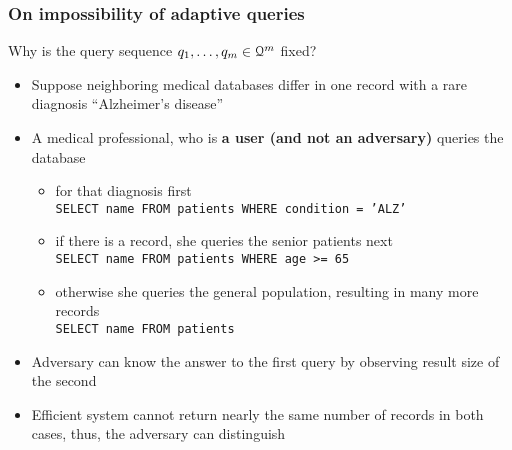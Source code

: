 	\begin{frame}[label={frame:appendix:cdp-odb-adaptive}]

		\frametitle{On impossibility of adaptive queries}

		\begin{block}{Why is the query sequence $\fromNtoM{\query}{1}{m} \in \querySet^m$ fixed?}
			\justify%

			\begin{itemize}
				\item<1-> Suppose neighboring medical databases differ in one record with a rare diagnosis ``Alzheimer's disease''
				\item<2-> A medical professional, who is \textbf{a user (and not an adversary)} queries the database
					\begin{itemize}
						\item
							for that diagnosis first \\
							\texttt{SELECT name FROM patients WHERE condition = 'ALZ'} %

						\item
							if there is a record, she queries the senior patients next \\
							\texttt{SELECT name FROM patients WHERE age >= 65}

						\item
							otherwise she queries the general population, resulting in many more records \\
							\texttt{SELECT name FROM patients}
					\end{itemize}
				\item<3-> \alert{Adversary can know the answer to the first query by observing result size of the second}
				\item<3-> Efficient system cannot return nearly the same number of records in both cases, thus, the adversary can distinguish
			\end{itemize}

		\end{block}

		\begin{flushright}
			\hyperlink{frame:epsolute-cdp-odb}{}
		\end{flushright}

	\end{frame}


